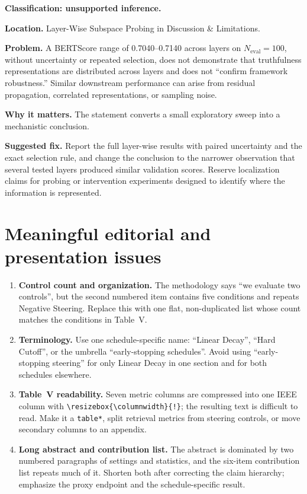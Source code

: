 \documentclass[11pt]{article}
\begin{document}
\textbf{Classification: unsupported inference.}

\textbf{Location.} Layer-Wise Subspace Probing in Discussion \& Limitations.

\textbf{Problem.} A BERTScore range of 0.7040--0.7140 across layers on $N_{\text{eval}}=100$, without uncertainty or repeated selection, does not demonstrate that truthfulness representations are distributed across layers and does not ``confirm framework robustness.''  Similar downstream performance can arise from residual propagation, correlated representations, or sampling noise.

\textbf{Why it matters.} The statement converts a small exploratory sweep into a mechanistic conclusion.

\textbf{Suggested fix.} Report the full layer-wise results with paired uncertainty and the exact selection rule, and change the conclusion to the narrower observation that several tested layers produced similar validation scores.  Reserve localization claims for probing or intervention experiments designed to identify where the information is represented.

\section*{Meaningful editorial and presentation issues}

\begin{enumerate}
 \item \textbf{Control count and organization.} The methodology says ``we evaluate two controls'', but the second numbered item contains five conditions and repeats Negative Steering.  Replace this with one flat, non-duplicated list whose count matches the conditions in Table~V.
 \item \textbf{Terminology.} Use one schedule-specific name: ``Linear Decay'', ``Hard Cutoff'', or the umbrella ``early-stopping schedules''.  Avoid using ``early-stopping steering'' for only Linear Decay in one section and for both schedules elsewhere.
 \item \textbf{Table~V readability.} Seven metric columns are compressed into one IEEE column with \verb|\resizebox{\columnwidth}{!}|; the resulting text is difficult to read.  Make it a \verb|table*|, split retrieval metrics from steering controls, or move secondary columns to an appendix.
 \item \textbf{Long abstract and contribution list.} The abstract is dominated by two numbered paragraphs of settings and statistics, and the six-item contribution list repeats much of it.  Shorten both after correcting the claim hierarchy; emphasize the proxy endpoint and the schedule-specific result.
\end{enumerate}
\end{document}
